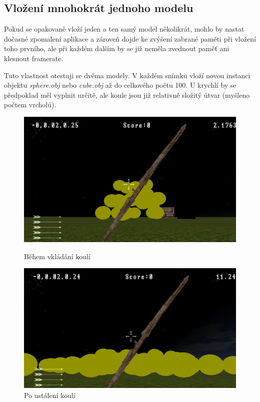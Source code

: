 \subsection{Vložení mnohokrát jednoho modelu}
Pokud se opakovaně vloží jeden a ten samý model několikrát, mohlo by nastat dočasné zpomalení aplikace a zároveň dojde ke zvýšení zabrané paměti při vložení toho prvního, ale při každém dalším by se již neměla zvednout paměť ani klesnout framerate.

Tuto vlastnost otestuji se dvěma modely. V každém snímku vloží novou instanci objektu \emph{sphere.obj} nebo \emph{cube.obj} až do celkového počtu 100. U krychlí by se předpoklad měl vyplnit určitě, ale koule jsou již relativně složitý útvar (myšleno počtem vrcholů).
\begin{figure}[!tbp]
	\centering
	\begin{minipage}[b]{0.4\textwidth}
		\includegraphics[width=\textwidth]{obrazky-figures/19}
		\caption{Během vkládání koulí}
	\end{minipage}
	\hfill
	\begin{minipage}[b]{0.4\textwidth}
		\includegraphics[width=\textwidth]{obrazky-figures/20}
		\caption{Po ustálení koulí}
	\end{minipage}
\end{figure}

